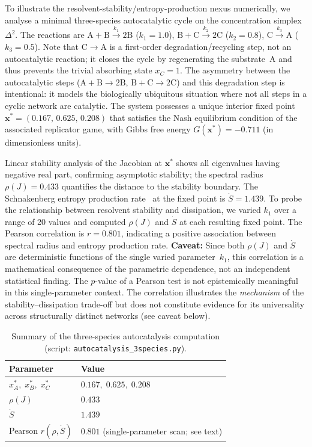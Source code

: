\documentclass[12pt,a4paper]{article}
\theoremstyle{remark}
\begin{document}
To illustrate the resolvent-stability/entropy-production nexus numerically, we analyse a minimal three-species autocatalytic cycle on the concentration simplex $\Delta^2$.
The reactions are $\mathrm{A}+\mathrm{B}\xrightarrow{k_1}2\mathrm{B}$ ($k_1=1.0$), $\mathrm{B}+\mathrm{C}\xrightarrow{k_2}2\mathrm{C}$ ($k_2=0.8$), $\mathrm{C}\xrightarrow{k_3}\mathrm{A}$ ($k_3=0.5$).
Note that $\mathrm{C}\to\mathrm{A}$ is a first-order degradation/recycling step, not an autocatalytic reaction; it closes the cycle by regenerating the substrate~A and thus prevents the trivial absorbing state $x_C=1$. The asymmetry between the autocatalytic steps ($\mathrm{A}+\mathrm{B}\to 2\mathrm{B}$, $\mathrm{B}+\mathrm{C}\to 2\mathrm{C}$) and this degradation step is intentional: it models the biologically ubiquitous situation where not all steps in a cyclic network are catalytic.
The system possesses a unique interior fixed point $\mathbf{x}^*=(0.167,\,0.625,\,0.208)$ that satisfies the Nash equilibrium condition of the associated replicator game, with Gibbs free energy $G(\mathbf{x}^*)=-0.711$ (in dimensionless units).

Linear stability analysis of the Jacobian at $\mathbf{x}^*$ shows all eigenvalues having negative real part, confirming asymptotic stability; the spectral radius $\rho(J) = 0.433$ quantifies the distance to the stability boundary.
The Schnakenberg entropy production rate~\citep{Schnakenberg1976} at the fixed point is $\dot{S}=1.439$.
To probe the relationship between resolvent stability and dissipation, we varied $k_1$ over a range of 20 values and computed $\rho(J)$ and $\dot{S}$ at each resulting fixed point.
The Pearson correlation is $r=0.801$, indicating a positive association between spectral radius and entropy production rate. \textbf{Caveat:} Since both $\rho(J)$ and $\dot{S}$ are deterministic functions of the single varied parameter~$k_1$, this correlation is a mathematical consequence of the parametric dependence, not an independent statistical finding. The $p$-value of a Pearson test is not epistemically meaningful in this single-parameter context. The correlation illustrates the \emph{mechanism} of the stability--dissipation trade-off but does not constitute evidence for its universality across structurally distinct networks (see caveat below).

\begin{table}[htbp]
\centering
\caption{Summary of the three-species autocatalysis computation (script: \texttt{autocatalysis\_3species.py}).}
\label{tab:3species}
\small
\begin{tabular}{ll}
\toprule
\textbf{Parameter} & \textbf{Value} \\
\midrule
$x^*_A,\; x^*_B,\; x^*_C$ & $0.167,\; 0.625,\; 0.208$ \\
$\rho(J)$ & $0.433$ \\
$\dot{S}$ & $1.439$ \\
Pearson $r(\rho,\dot{S})$ & $0.801$ (single-parameter scan; see text) \\
\bottomrule
\end{tabular}
\end{table}
\end{document}
